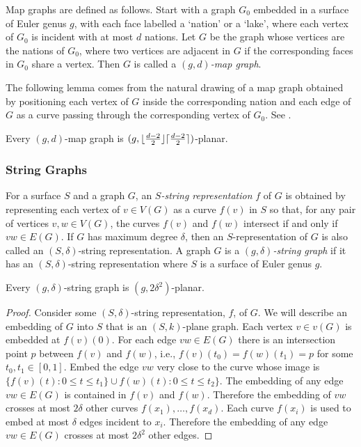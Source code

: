 \documentclass{patmorin}
\begin{document}
Map graphs are defined as follows. Start with a graph $G_0$ embedded in a surface of Euler genus $g$, with each face labelled a `nation' or a `lake', where each vertex of $G_0$ is incident with at most $d$ nations. Let $G$ be the graph whose vertices are the nations of $G_0$, where two vertices are adjacent in $G$ if the corresponding faces in $G_0$ share a vertex. Then $G$ is called a \emph{$(g,d)$-map graph}. 

The following lemma comes from the natural drawing of a map graph obtained by positioning each vertex of $G$ inside the corresponding nation and each edge of $G$ as a curve passing through the corresponding vertex of $G_0$. See \citet[Page~4]{dujmovic.eppstein.ea:structure}.

\begin{lem}
  Every $(g, d)$-map graph is $(g, {\lfloor \frac{d-2}{2} \rfloor}{\lceil \frac{d-2}{2} \rceil})$-planar.
\end{lem}

\subsubsection{String Graphs}

For a surface $S$ and a graph $G$, an \emph{$S$-string representation} $f$ of $G$ is obtained by representing each vertex of $v\in V(G)$ as a curve $f(v)$ in $S$ so that, for any pair of vertices $v,w\in V(G)$, the curves $f(v)$ and $f(w)$ intersect if and only if $vw\in E(G)$.  If $G$ has maximum degree $\delta$, then an $S$-representation of $G$ is also called an $(S,\delta)$-string representation.  A graph $G$ is a \emph{$(g,\delta)$-string graph} if it has an $(S,\delta)$-string representation where $S$ is a surface of Euler genus $g$.

\begin{lem}
  Every $(g,\delta)$-string graph is $(g,2\delta^2)$-planar.
\end{lem}

\begin{proof}
  Consider some $(S,\delta)$-string representation, $f$, of $G$.  We will describe an embedding of $G$ into $S$ that is an $(S,k)$-plane graph.  Each vertex $v\in v(G)$ is embedded at $f(v)(0)$. For each edge $vw\in E(G)$ there is an intersection point $p$ between $f(v)$ and $f(w)$, i.e., $f(v)(t_0)=f(w)(t_1)=p$ for some $t_0,t_1\in[0,1]$.  Embed the edge $vw$ very close to the curve whose image is $\{f(v)(t): 0\le t\le t_1\}\cup f(w)(t): 0 \le t\le t_2\}$. The embedding of any edge $vw\in E(G)$ is contained in $f(v)$ and $f(w)$.  Therefore the embedding of $vw$ crosses at most $2\delta$ other curves $f(x_1),\ldots,f(x_d)$.  Each curve $f(x_i)$ is used to embed at most $\delta$ edges incident to $x_i$.  Therefore the embedding of any edge $vw\in E(G)$ crosses at most $2\delta^2$ other edges.  
\end{proof}
\end{document}
